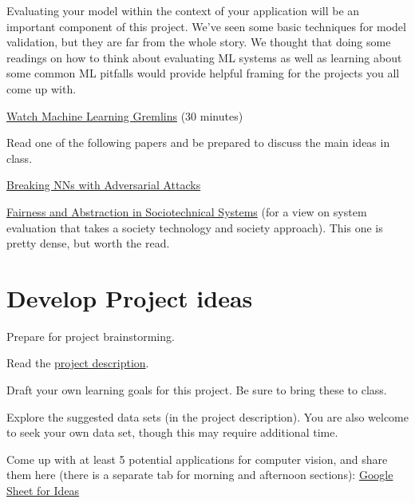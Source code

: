 \documentclass[assignment08_Solutions]{subfiles}
\begin{document}
\begin{exercise}[(80 minutes)]
Evaluating your model within the context of your application will be an important component of this project.  We've seen some basic techniques for model validation, but they are far from the whole story.  We thought that doing some readings on how to think about evaluating ML systems as well as learning about some common ML pitfalls would provide helpful framing for the projects you all come up with.

\bes
\item \href{https://www.youtube.com/watch?v=tleeC-KlsKA}{Watch Machine Learning Gremlins} (30 minutes)
\item Read one of the following papers and be prepared to discuss the main ideas in class.
\bi
\item \href{https://towardsdatascience.com/breaking-neural-networks-with-adversarial-attacks-f4290a9a45aa}{Breaking NNs with Adversarial Attacks}
\item \href{https://dl.acm.org/citation.cfm?id=3287598}{Fairness and Abstraction in Sociotechnical Systems} (for a view on system evaluation that takes a society technology and society approach).  This one is pretty dense, but worth the read.
\ei
\ees

\end{exercise}


\section{Develop Project ideas}

\begin{exercise}
Prepare for project brainstorming.
\bes
\item Read the \href{https://github.com/olincollege/MLfall2021/blob/master/Module\%201/m1_project/m1_project.pdf}{project description}.
\item Draft your own learning goals for this project. Be sure to bring these to class.
\item Explore the suggested data sets (in the project description). You are also welcome to seek your own data set, though this may require additional time.
\item Come up with at least 5 potential applications for computer vision, and share them here (there is a separate tab for morning and afternoon sections): \href{https://docs.google.com/spreadsheets/d/1TyzKsfdCvZEzfaYswfJSHiYH2JU73gd0KCIOwQijvFo/edit?usp=sharing}{Google Sheet for Ideas} 
\ees 
\end{exercise}
 
\end{document}
